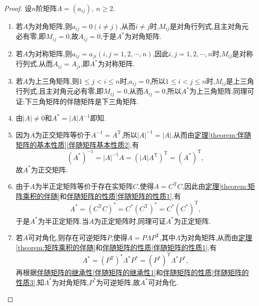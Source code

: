\documentclass[../../main.tex]{subfiles}%
\begin{document}
\begin{proof}

设\(n\)阶矩阵\(A = (a_{ij}),\ n \geqslant  2\).
\begin{enumerate}
\item 若\(A\)为对角矩阵,则\(a_{ij} = 0 (i \neq j)\),从而\(i \neq j\)时,\(M_{ij}\)是对角行列式,且主对角元必有零,即\(M_{ij} = 0\),故\(A_{ij} = 0\),于是\(A^*\)为对角矩阵.

\item 若\(A\)为对称矩阵,则\(a_{ij} = a_{ji} (i, j = 1, 2, \cdots, n)\),因此\(i, j = 1, 2, \cdots, n\)时,\(M_{ij}\)是对称行列式,从而\(A_{ij} = A_{ji}\),即\(A^*\)为对称矩阵.

\item 若\(A\)为上三角矩阵,则\(1 \leqslant  j < i \leqslant  n\)时,\(a_{ij} = 0\),所以\(1 \leqslant  i < j \leqslant  n\)时,\(M_{ij}\)是上三角行列式,且主对角元必有零,即\(M_{ij} = 0\),从而\(A_{ij} = 0\),所以\(A^*\)为上三角矩阵.同理可证:下三角矩阵的伴随矩阵是下三角矩阵.

\item 由\(\vert A \vert \neq 0\)和\(A^* = \vert A \vert A^{-1}\)即知.

\item 因为\(A\)为正交矩阵等价于\(A^{-1} = A^{\mathrm{T}}\),所以\(\vert A \vert^{-1} = \vert A \vert\).从而由\hyperref[伴随矩阵基本性质2]{定理\ref{theorem:伴随矩阵的基本性质}\ref{伴随矩阵基本性质2}},有
\[
(A^*)^{-1} = \vert A \vert^{-1} A = (\vert A \vert A^{\mathrm{T}})^{\mathrm{T}} = (A^*)^{\mathrm{T}},
\]
故\(A^*\)为正交矩阵.

\item 由于\(A\)为半正定矩阵等价于存在实矩阵\(C\),使得\(A = C^{\mathrm{T}}C\),因此由\hyperref[theorem:矩阵乘积的伴随]{定理\ref{theorem:矩阵乘积的伴随}}和\hyperref[伴随矩阵的性质1]{伴随矩阵的性质\ref{伴随矩阵的性质1}},有
\[
A^* = (C^{\mathrm{T}}C)^* = C^*(C^{\mathrm{T}})^* = C^*(C^*)^{\mathrm{T}},
\]
于是\(A^*\)为半正定矩阵.当\(A\)为正定矩阵时,同理可证\(A^*\)为正定矩阵.

\item 若\(A\)可对角化,则存在可逆矩阵\(P\),使得\(A = P\Lambda P^{\mathrm{T}}\),其中\(\Lambda\)为对角矩阵,从而由\hyperref[theorem:矩阵乘积的伴随]{定理\ref{theorem:矩阵乘积的伴随}}和\hyperref[伴随矩阵的性质1]{伴随矩阵的性质\ref{伴随矩阵的性质1}},有
\[
A^* = (P^{\mathrm{T}})^*\Lambda^*P^* = (P^*)^{\mathrm{T}}\Lambda^*P^*,
\]
再根据\hyperref[伴随矩阵的继承性1]{伴随矩阵的继承性\ref{伴随矩阵的继承性1}}和\hyperref[伴随矩阵的性质3]{伴随矩阵的性质\ref{伴随矩阵的性质3}},知\(\Lambda^*\)为对角矩阵,\(P^*\)为可逆矩阵,故\(A^*\)可对角化.
\end{enumerate}

\end{proof}
\end{document}
